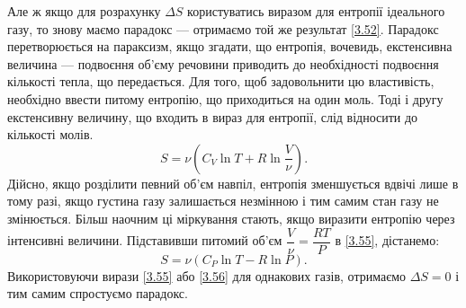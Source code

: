 


Але ж якщо для розрахунку $\Delta S$ користуватись виразом для ентропії ідеального газу, то знову
маємо парадокс --- отримаємо той же результат \eqref{3.52}. Парадокс перетворюється на параксизм, якщо
згадати, що ентропія, вочевидь, екстенсивна величина --- подвоєння об'єму речовини приводить до
необхідності подвоєння кількості тепла, що передається. Для того, щоб задовольнити цю властивість,
необхідно ввести питому ентропію, що приходиться на один моль. Тоді і другу екстенсивну величину, що
входить в вираз для ентропії, слід відносити до кількості молів.
\begin{equation}\label{3.55}
	S = \nu(C_V\ln T + R\ln\dfrac{V}{\nu}).
\end{equation}
Дійсно, якщо розділити певний об'єм навпіл, ентропія зменшується вдвічі лише в тому разі, якщо густина
газу залишається незмінною і тим самим стан газу не змінюється. Більш наочним ці міркування стають,
якщо
виразити ентропію через інтенсивні величини. Підставивши питомий об'єм $\dfrac{V}{\nu} =
\dfrac{RT}{P}$ в \eqref{3.55}, дістанемо:
\begin{equation}\label{3.56}
	S = \nu(C_{P} \ln T- R\ln P).
\end{equation}
Використовуючи вирази \eqref{3.55} або \eqref{3.56} для однакових газів, отримаємо $\Delta S =0$ і тим
самим спростуємо парадокс.